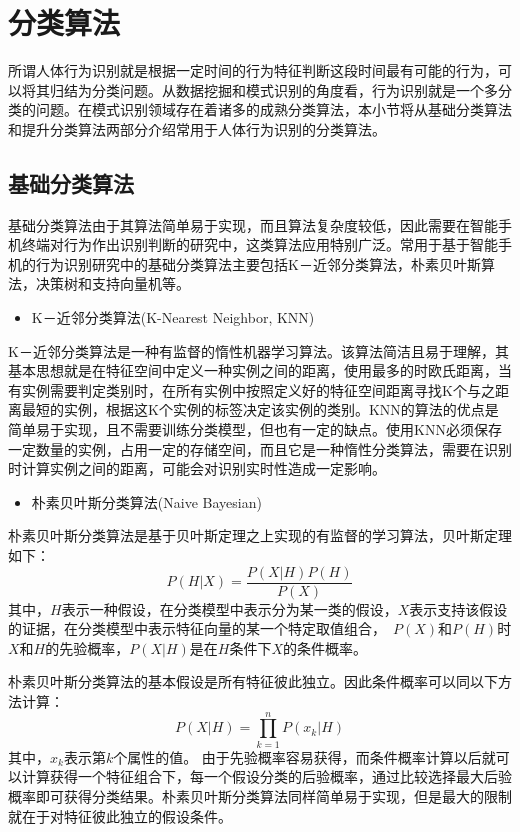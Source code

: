 \section{分类算法}
\par 所谓人体行为识别就是根据一定时间的行为特征判断这段时间最有可能的行为，可以将其归结为分类问题。从数据挖掘和模式识别的角度看，行为识别就是一个多分类的问题。在模式识别领域存在着诸多的成熟分类算法，本小节将从基础分类算法和提升分类算法两部分介绍常用于人体行为识别的分类算法。

\subsection{基础分类算法}
\par 基础分类算法由于其算法简单易于实现，而且算法复杂度较低，因此需要在智能手机终端对行为作出识别判断的研究中，这类算法应用特别广泛。常用于基于智能手机的行为识别研究中的基础分类算法主要包括K－近邻分类算法，朴素贝叶斯算法，决策树和支持向量机等。

\begin{itemize}
	\item K－近邻分类算法(K-Nearest Neighbor, KNN)
\end{itemize}
\par K－近邻分类算法是一种有监督的惰性机器学习算法。该算法简洁且易于理解，其基本思想就是在特征空间中定义一种实例之间的距离，使用最多的时欧氏距离，当有实例需要判定类别时，在所有实例中按照定义好的特征空间距离寻找K个与之距离最短的实例，根据这K个实例的标签决定该实例的类别。KNN的算法的优点是简单易于实现，且不需要训练分类模型，但也有一定的缺点。使用KNN必须保存一定数量的实例，占用一定的存储空间，而且它是一种惰性分类算法，需要在识别时计算实例之间的距离，可能会对识别实时性造成一定影响。
\begin{itemize}
	\item 朴素贝叶斯分类算法(Naive Bayesian)
\end{itemize}
\par 朴素贝叶斯分类算法是基于贝叶斯定理之上实现的有监督的学习算法，贝叶斯定理如下：
\begin{equation}
	P(H|X) = \frac{P(X|H)P(H)}{P(X)}
\end{equation}
其中，$H$表示一种假设，在分类模型中表示分为某一类的假设，$X$表示支持该假设的证据，在分类模型中表示特征向量的某一个特定取值组合，　$P(X)$和$P(H)$时$X$和$H$的先验概率，$P(X|H)$是在$H$条件下$X$的条件概率。
\par 朴素贝叶斯分类算法的基本假设是所有特征彼此独立。因此条件概率可以同以下方法计算：
\begin{equation}
	P(X|H) = \prod_{k=1}^{n}P(x_k|H)
\end{equation}
其中，$x_k$表示第$k$个属性的值。
由于先验概率容易获得，而条件概率计算以后就可以计算获得一个特征组合下，每一个假设分类的后验概率，通过比较选择最大后验概率即可获得分类结果。朴素贝叶斯分类算法同样简单易于实现，但是最大的限制就在于对特征彼此独立的假设条件。

